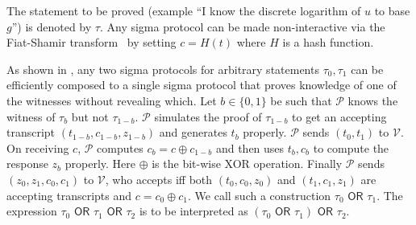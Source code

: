 \documentclass[runningheads]{llncs}
\begin{document}
The statement to be proved (example ``I know the discrete logarithm of $u$ to base $g$'') is denoted by $\tau$.
Any sigma protocol can be made non-interactive via the Fiat-Shamir transform~\cite{fiatshamir} by setting $c= H(t)$ where $H$ is a hash function. 

As shown in \cite{CDS94}, any two sigma protocols for arbitrary statements $\tau_0, \tau_1$ can be efficiently composed to a single sigma protocol that proves knowledge of one of the witnesses without revealing which. Let $b \in \{0, 1\}$ be such that $\mathcal{P}$ knows the witness of $\tau_{b}$ but not $\tau_{1-b}$. 
$\mathcal{P}$ simulates the proof of $\tau_{1-b}$ to get an accepting transcript $(t_{1-b}, c_{1-b}, z_{1-b})$ and generates $t_b$ properly. $\mathcal{P}$ sends $(t_0, t_1)$ to $\mathcal{V}$. On receiving $c$, $\mathcal{P}$ computes $c_b = c \oplus c_{1-b}$ and then uses $t_b, c_b$ to compute the response $z_b$ properly. Here $\oplus$ is the bit-wise XOR operation. Finally $\mathcal{P}$ sends $(z_0, z_1, c_0, c_1)$ to $\mathcal{V}$, who accepts iff both $(t_0, c_0, z_0)$ and $(t_1, c_1, z_1)$ are accepting transcripts and $c = c_0 \oplus c_1$.
We call such a construction $\tau_0 \textsf{ OR } \tau_1$. The expression $\tau_0\textsf{ OR }\tau_1\textsf{ OR }\tau_2$ is to be interpreted as $(\tau_0\textsf{ OR }\tau_1)\textsf{ OR }\tau_2$.
\end{document}
